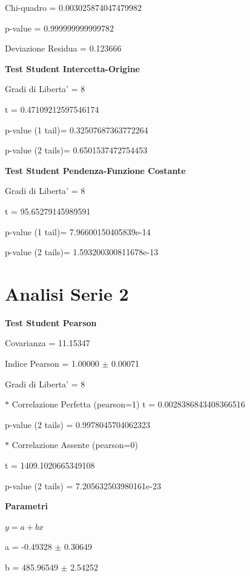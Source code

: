 \documentclass{article}
\begin{document}
Chi-quadro = 0.003025874047479982

p-value = 0.999999999999782

Deviazione Residua = 0.123666

\textbf{Test Student Intercetta-Origine}

Gradi di Liberta' = 8

t = 0.47109212597546174

p-value (1 tail)= 0.32507687363772264

p-value (2 tails)= 0.6501537472754453

\textbf{Test Student Pendenza-Funzione Costante}

Gradi di Liberta' = 8

t = 95.65279145989591

p-value (1 tail)= 7.96600150405839e-14

p-value (2 tails)= 1.593200300811678e-13

\section*{Analisi Serie 2}

\textbf{Test Student Pearson}

Covarianza = 11.15347

Indice Pearson = 1.00000 $\pm$ 0.00071

Gradi di Liberta' = 8

$\ast$ Correlazione Perfetta (pearson=1)
t = 0.0028386843408366516

p-value (2 tails) = 0.9978045704062323

$\ast$ Correlazione Assente (pearson=0)

t = 1409.1020665349108

p-value (2 tails) = 7.205632503980161e-23

\textbf{Parametri}

$y = a + bx$

a = -0.49328 $\pm$ 0.30649

b = 485.96549 $\pm$ 2.54252
\end{document}
